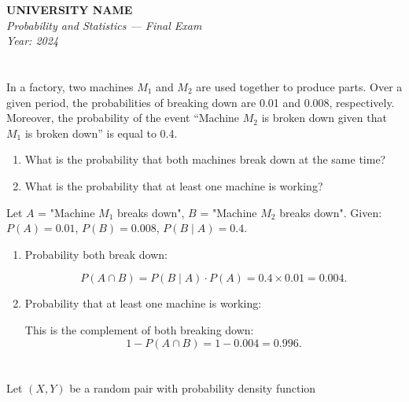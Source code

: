 \documentclass[12pt]{article}
\begin{document}
\begin{center}
  \Large\textbf{UNIVERSITY NAME} \\[1em]
  \large\textit{Probability and Statistics — Final Exam} \\[0.5em]
  \large\textit{Year: 2024} \\[2em]
\end{center}

\vspace{0.5cm}

\section{}
In a factory, two machines \( M_1 \) and \( M_2 \) are used together to produce parts. Over a given period, the probabilities of breaking down are 0.01 and 0.008, respectively. Moreover, the probability of the event “Machine \( M_2 \) is broken down given that \( M_1 \) is broken down” is equal to 0.4.

\begin{enumerate}
    \item What is the probability that both machines break down at the same time?
    \item What is the probability that at least one machine is working?
\end{enumerate}

\begin{answerbox}
Let \(A\) = "Machine \(M_1\) breaks down", \(B\) = "Machine \(M_2\) breaks down".  
Given:  
\(P(A) = 0.01\), \(P(B) = 0.008\), \(P(B \mid A) = 0.4\).

\begin{enumerate}
  \item Probability both break down:

  \[
P(A \cap B) = P(B \mid A) \cdot P(A) = 0.4 \times 0.01 = 0.004.
\]

  \item Probability that at least one machine is working:

  This is the complement of both breaking down:
\[
1 - P(A \cap B) = 1 - 0.004 = 0.996.
\]
\end{enumerate}
\end{answerbox}

\section{}
Let \( (X, Y) \) be a random pair with probability density function
\end{document}
